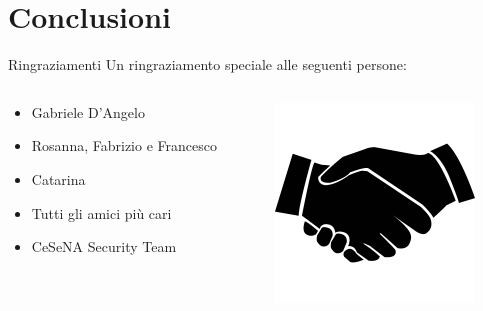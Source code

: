 \documentclass[12pt]{beamer}
\begin{document}
  \section{Conclusioni}
  \begin{frame}[fragile]{Ringraziamenti}
  	Un ringraziamento speciale alle seguenti persone:
  	\begin{columns}
    	\begin{column}{0.7\textwidth}
      		\begin{itemize}
  				\item Gabriele D'Angelo
  				\item Rosanna, Fabrizio e Francesco
  				\item Catarina
  				\item Tutti gli amici più cari
  				\item CeSeNA Security Team
  			\end{itemize}
    	\end{column}
    	\begin{column}{0.4\textwidth}
      		\includegraphics[scale=0.4]{res/Acknowledgments}
    	\end{column}
  	\end{columns}
  \end{frame}
\end{document}
